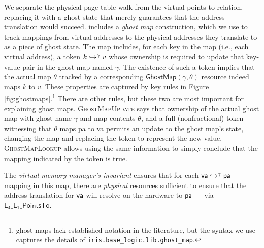   We separate the physical page-table walk from the virtual points-to relation, replacing it with a ghost state that merely guarantees that the address translation would succeed.
  \iris includes a \emph{ghost map} construction, which we use to track mappings from virtual addresses to the physical addresses they translate to as a piece of ghost state.
  The map includes, for each key in the map (i.e.,
  each virtual address), a token $k\hookrightarrow^{\gamma}v$ whose ownership is required to update that key-value pair in the ghost map named $\gamma$. The existence of such a token implies that the actual map $\theta$ tracked by a corresponding $\mathsf{GhostMap}(\gamma,\theta)$
  resource indeed maps $k$ to $v$. These properties are captured by key \iris rules in Figure \ref{fig:ghostmaps}.\footnote{\iris ghost maps lack established notation in the literature,
  but the syntax we use captures the details of \texttt{iris.base\_logic.lib.ghost\_map}.}
  There are other rules, but these two are most important for explaining ghost maps.
  \textsc{GhostMapUpdate} says that ownership of the actual ghost map with ghost name $\gamma$ and map contents $\theta$,
  and a full (nonfractional) token witnessing that $\theta$ maps \textsf{pa} to \textsf{va} permits an update to the ghost map's state,
  changing the map and replacing the token to represent the new value.
  \textsc{GhostMapLookup} allows using the same information to simply conclude that the mapping indicated by the token is true.
  
  The \emph{virtual memory manager's invariant} ensures that for each $\mathsf{va}\hookrightarrow^{\gamma}\textsf{pa}$ mapping in this map, there are \emph{physical} resources sufficient to ensure that the address translation for $\mathsf{va}$
will resolve on the hardware to $\textsf{pa}$ --- via $\textsf{L}_{4}\_\textsf{L}_{1}\_\textsf{PointsTo}$.


